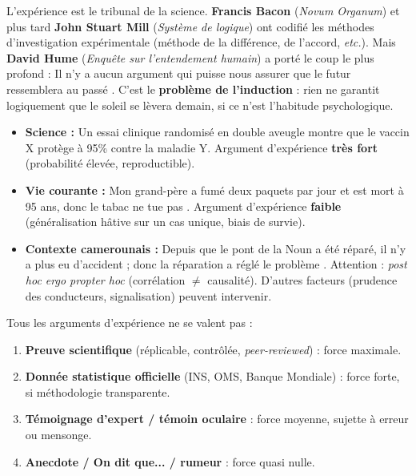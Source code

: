 \documentclass[11pt]{article}
\begin{document}
L'expérience est le tribunal de la science. \textbf{Francis Bacon} (\emph{Novum Organum}) et plus tard \textbf{John Stuart Mill} (\emph{Système de logique}) ont codifié les méthodes d'investigation expérimentale (méthode de la différence, de l'accord, \emph{etc.}). Mais \textbf{David Hume} (\emph{Enquête sur l'entendement humain}) a porté le coup le plus profond : \guillemotleft Il n'y a aucun argument qui puisse nous assurer que le futur ressemblera au passé \guillemotright. C'est le \textbf{problème de l'induction} : rien ne garantit logiquement que le soleil se lèvera demain, si ce n'est l'habitude psychologique.

\begin{exemplebox}
\begin{itemize}
    \item \textbf{Science :} Un essai clinique randomisé en double aveugle montre que le vaccin X protège à 95\% contre la maladie Y. Argument d'expérience \textbf{très fort} (probabilité élevée, reproductible).
    \item \textbf{Vie courante :} \guillemotleft Mon grand-père a fumé deux paquets par jour et est mort à 95 ans, donc le tabac ne tue pas \guillemotright. Argument d'expérience \textbf{faible} (généralisation hâtive sur un cas unique, biais de survie).
    \item \textbf{Contexte camerounais :} \guillemotleft Depuis que le pont de la Noun a été réparé, il n'y a plus eu d'accident ; donc la réparation a réglé le problème \guillemotright. Attention : \emph{post hoc ergo propter hoc} (corrélation $\neq$ causalité). D'autres facteurs (prudence des conducteurs, signalisation) peuvent intervenir.
\end{itemize}
\end{exemplebox}

\begin{aretenir}
Tous les arguments d'expérience ne se valent pas :
\begin{enumerate}
    \item \textbf{Preuve scientifique} (réplicable, contrôlée, \emph{peer-reviewed}) : force maximale.
    \item \textbf{Donnée statistique officielle} (INS, OMS, Banque Mondiale) : force forte, si méthodologie transparente.
    \item \textbf{Témoignage d'expert / témoin oculaire} : force moyenne, sujette à erreur ou mensonge.
    \item \textbf{Anecdote / \guillemotleft On dit que... \guillemotright / rumeur} : force quasi nulle.
\end{enumerate}
\end{aretenir}
\end{document}
